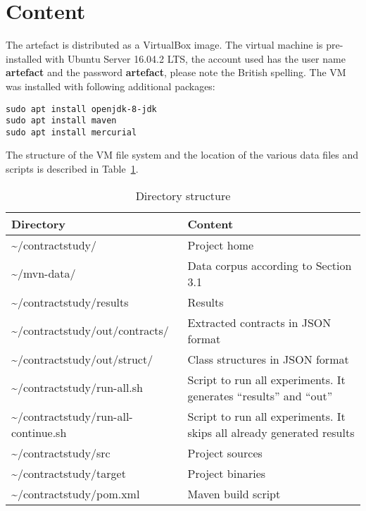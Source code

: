 \documentclass[a4paper,UKenglish]{darts}
\newenvironment{content}{\section{Content}}{}
\begin{document}
\begin{content}
	
The artefact is distributed as a VirtualBox image. The virtual machine is pre-installed with Ubuntu Server 16.04.2 LTS, the account used has the user name \textbf{artefact} and the password \textbf{artefact}, please note the British spelling. The VM was installed with following additional packages:

\begin{verbatim}
sudo apt install openjdk-8-jdk
sudo apt install maven
sudo apt install mercurial 
\end{verbatim}

The structure of the VM file system and the location of the various data files and scripts is described in Table~\ref{tab:structure}.

\begin{table}[t]
	\centering
	\caption{Directory structure}
	\label{tab:structure}
	\begin{tabular}{p{6cm} p{8cm} } \hline
		Directory & Content \\ \hline
		\textasciitilde/contractstudy/ & Project home \\
		\textasciitilde/mvn-data/  & Data corpus according to Section 3.1 \\
		\textasciitilde/contractstudy/results & Results \\
		\textasciitilde/contractstudy/out/contracts/ & Extracted contracts in JSON format \\
		\textasciitilde/contractstudy/out/struct/ & Class structures in JSON format \\
		\textasciitilde/contractstudy/run-all.sh & Script to run all experiments. It generates “results” and “out”  \\
		\textasciitilde/contractstudy/run-all-continue.sh & Script to run all experiments. It skips all already generated results \\
		\textasciitilde/contractstudy/src & Project sources  \\
		\textasciitilde/contractstudy/target & Project binaries  \\
		\textasciitilde/contractstudy/pom.xml & Maven build script  \\
		\hline
	\end{tabular}
\end{table}



\end{content} 
\end{document}
